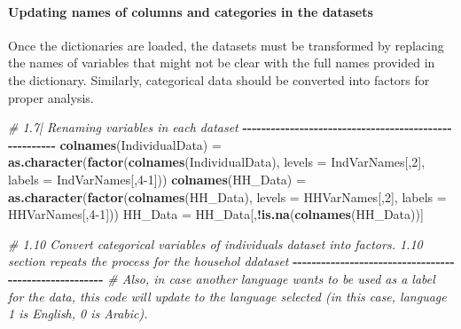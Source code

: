 \documentclass[
]{article}
\newenvironment{Shaded}{\begin{snugshade}}{\end{snugshade}}
\newcommand{\AttributeTok}[1]{\textcolor[rgb]{0.13,0.29,0.53}{#1}}
\newcommand{\CommentTok}[1]{\textcolor[rgb]{0.56,0.35,0.01}{\textit{#1}}}
\newcommand{\DecValTok}[1]{\textcolor[rgb]{0.00,0.00,0.81}{#1}}
\newcommand{\FunctionTok}[1]{\textcolor[rgb]{0.13,0.29,0.53}{\textbf{#1}}}
\newcommand{\NormalTok}[1]{#1}
\newcommand{\OtherTok}[1]{\textcolor[rgb]{0.56,0.35,0.01}{#1}}
\newcommand{\SpecialCharTok}[1]{\textcolor[rgb]{0.81,0.36,0.00}{\textbf{#1}}}
\begin{document}
\paragraph{Updating names of columns and categories in the
datasets}\label{updating-names-of-columns-and-categories-in-the-datasets}

Once the dictionaries are loaded, the datasets must be transformed by
replacing the names of variables that might not be clear with the full
names provided in the dictionary. Similarly, categorical data should be
converted into factors for proper analysis.

\begin{Shaded}
\begin{Highlighting}[]
\CommentTok{\# 1.7| Renaming variables in each dataset}
\SpecialCharTok{{-}{-}{-}{-}{-}{-}{-}{-}{-}{-}{-}{-}{-}{-}{-}{-}{-}{-}{-}{-}{-}{-}{-}{-}{-}{-}{-}{-}{-}{-}{-}{-}{-}{-}{-}{-}{-}{-}{-}{-}{-}{-}{-}{-}{-}{-}{-}{-}{-}{-}{-}{-}{-}{-}}
\FunctionTok{colnames}\NormalTok{(IndividualData) }\OtherTok{=} \FunctionTok{as.character}\NormalTok{(}\FunctionTok{factor}\NormalTok{(}\FunctionTok{colnames}\NormalTok{(IndividualData),}
                                          \AttributeTok{levels =}\NormalTok{ IndVarNames[,}\DecValTok{2}\NormalTok{],}
                                          \AttributeTok{labels =}\NormalTok{ IndVarNames[,}\DecValTok{4{-}1}\NormalTok{]))}
\FunctionTok{colnames}\NormalTok{(HH\_Data) }\OtherTok{=} \FunctionTok{as.character}\NormalTok{(}\FunctionTok{factor}\NormalTok{(}\FunctionTok{colnames}\NormalTok{(HH\_Data),}
                                      \AttributeTok{levels =}\NormalTok{ HHVarNames[,}\DecValTok{2}\NormalTok{],}
                                      \AttributeTok{labels =}\NormalTok{ HHVarNames[,}\DecValTok{4{-}1}\NormalTok{]))}
\NormalTok{HH\_Data }\OtherTok{=}\NormalTok{ HH\_Data[,}\SpecialCharTok{!}\FunctionTok{is.na}\NormalTok{(}\FunctionTok{colnames}\NormalTok{(HH\_Data))]}

\CommentTok{\# 1.10 Convert categorical variables of individuals dataset into factors. 1.10 section repeats the process for the househol ddataset }
\SpecialCharTok{{-}{-}{-}{-}{-}{-}{-}{-}{-}{-}{-}{-}{-}{-}{-}{-}{-}{-}{-}{-}{-}{-}{-}{-}{-}{-}{-}{-}{-}{-}{-}{-}{-}{-}{-}{-}{-}{-}{-}{-}{-}{-}{-}{-}{-}{-}{-}{-}{-}{-}{-}{-}{-}{-}}
\CommentTok{\# Also, in case another language wants to be used as a label for the data, this code will update to the language selected (in this case, language 1 is English, 0 is Arabic).}


\end{Highlighting}
\end{Shaded}
\end{document}

